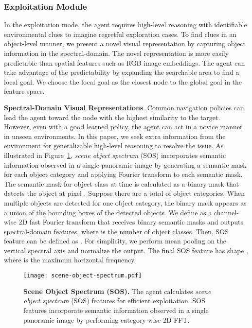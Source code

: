 \documentclass[10pt,twocolumn,letterpaper]{article}
\begin{document}
\subsubsection{Exploitation Module}\label{sec:exploitation-module}
\vspace{-0.2cm}
In the exploitation mode, the agent requires high-level reasoning with identifiable environmental clues to imagine regretful exploration cases. To find clues in an object-level manner, we present a novel visual representation by capturing object information in the spectral-domain. The novel representation is more easily predictable than spatial features such as RGB image embeddings. The agent can take advantage of the predictability by expanding the searchable area to find a local goal. We choose the local goal as the closest node to the global goal in the feature space.\\
\vspace{-0.3cm}

\noindent\textbf{Spectral-Domain Visual Representations}.
Common navigation policies can lead the agent toward the node with the highest similarity to the target.
However, even with a good learned policy, the agent can act in a novice manner in unseen environments.
In this paper, we seek extra information from the environment for generalizable high-level reasoning to resolve the issue. As illustrated in Figure~\ref{fig:scene-object-spectrum},
\textit{scene object spectrum} (SOS) incorporates semantic information observed in a single panoramic image by
generating a semantic mask for each object category and applying Fourier transform to each semantic mask. The semantic mask for object class  at time  is calculated as a binary mask  that detects the object at pixel .
Suppose there are a total of  object categories. When multiple objects are detected for one object category, the binary mask appears as a union of the bounding boxes of the detected objects. We define  as a channel-wise 2D fast Fourier transform
that receives  binary semantic masks and outputs  spectral-domain features, where  is the number of object classes. 
Then, SOS feature  can be defined as . For simplicity, we perform mean pooling on the vertical spectral axis and normalize the output. The final SOS feature has shape , where  is the maximum horizontal frequency.

\begin{figure}[t!]{\centering\texttt{[image: scene-object-spectrum.pdf]}}\centering
\caption{\protect\renewcommand{\baselinestretch}{0.9}\small{{\textbf{Scene Object Spectrum (SOS).} The agent calculates \textit{scene object spectrum} (SOS) features for efficient exploitation. SOS features incorporate semantic information observed in a single panoramic image by performing category-wise 2D FFT.}\vspace{-0.4cm} }} \label{fig:scene-object-spectrum}\end{figure}
\end{document}
